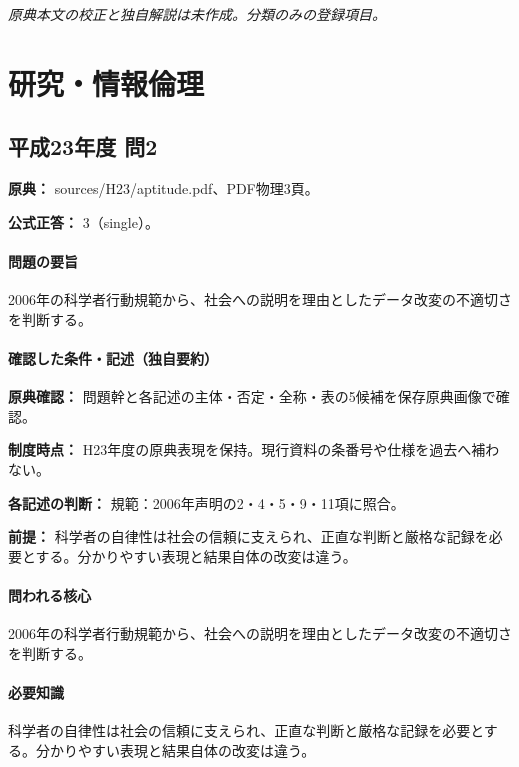 \par\textit{原典本文の校正と独自解説は未作成。分類のみの登録項目。}

\section{研究・情報倫理}

\subsection{平成23年度 問2}
\label{q:h23-reg-apt-02}

\noindent\textbf{原典：} sources/H23/aptitude.pdf、PDF物理3頁。

\textbf{公式正答：} 3（single）。

\paragraph{問題の要旨} 2006年の科学者行動規範から、社会への説明を理由としたデータ改変の不適切さを判断する。

\paragraph{確認した条件・記述（独自要約）}\mbox{}\par

\noindent\textbf{原典確認：} 問題幹と各記述の主体・否定・全称・表の5候補を保存原典画像で確認。\par

\noindent\textbf{制度時点：} H23年度の原典表現を保持。現行資料の条番号や仕様を過去へ補わない。\par

\noindent\textbf{各記述の判断：} 規範：2006年声明の2・4・5・9・11項に照合。\par

\noindent\textbf{前提：} 科学者の自律性は社会の信頼に支えられ、正直な判断と厳格な記録を必要とする。分かりやすい表現と結果自体の改変は違う。\par

\paragraph{問われる核心} 2006年の科学者行動規範から、社会への説明を理由としたデータ改変の不適切さを判断する。

\paragraph{必要知識} 科学者の自律性は社会の信頼に支えられ、正直な判断と厳格な記録を必要とする。分かりやすい表現と結果自体の改変は違う。

